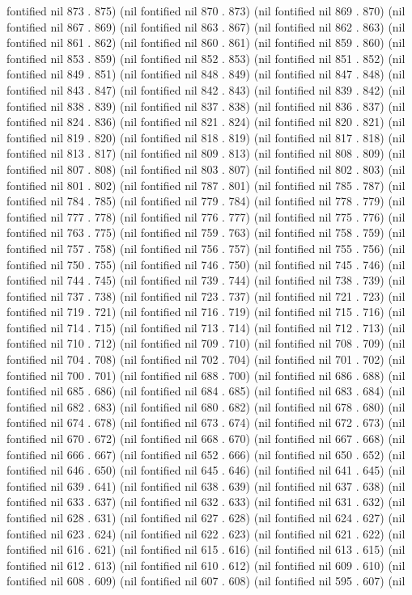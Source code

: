 fontified nil 873 . 875) (nil fontified nil 870 . 873) (nil fontified nil 869 . 870) (nil fontified nil 867 . 869) (nil fontified nil 863 . 867) (nil fontified nil 862 . 863) (nil fontified nil 861 . 862) (nil fontified nil 860 . 861) (nil fontified nil 859 . 860) (nil fontified nil 853 . 859) (nil fontified nil 852 . 853) (nil fontified nil 851 . 852) (nil fontified nil 849 . 851) (nil fontified nil 848 . 849) (nil fontified nil 847 . 848) (nil fontified nil 843 . 847) (nil fontified nil 842 . 843) (nil fontified nil 839 . 842) (nil fontified nil 838 . 839) (nil fontified nil 837 . 838) (nil fontified nil 836 . 837) (nil fontified nil 824 . 836) (nil fontified nil 821 . 824) (nil fontified nil 820 . 821) (nil fontified nil 819 . 820) (nil fontified nil 818 . 819) (nil fontified nil 817 . 818) (nil fontified nil 813 . 817) (nil fontified nil 809 . 813) (nil fontified nil 808 . 809) (nil fontified nil 807 . 808) (nil fontified nil 803 . 807) (nil fontified nil 802 . 803) (nil fontified nil 801 . 802) (nil fontified nil 787 . 801) (nil fontified nil 785 . 787) (nil fontified nil 784 . 785) (nil fontified nil 779 . 784) (nil fontified nil 778 . 779) (nil fontified nil 777 . 778) (nil fontified nil 776 . 777) (nil fontified nil 775 . 776) (nil fontified nil 763 . 775) (nil fontified nil 759 . 763) (nil fontified nil 758 . 759) (nil fontified nil 757 . 758) (nil fontified nil 756 . 757) (nil fontified nil 755 . 756) (nil fontified nil 750 . 755) (nil fontified nil 746 . 750) (nil fontified nil 745 . 746) (nil fontified nil 744 . 745) (nil fontified nil 739 . 744) (nil fontified nil 738 . 739) (nil fontified nil 737 . 738) (nil fontified nil 723 . 737) (nil fontified nil 721 . 723) (nil fontified nil 719 . 721) (nil fontified nil 716 . 719) (nil fontified nil 715 . 716) (nil fontified nil 714 . 715) (nil fontified nil 713 . 714) (nil fontified nil 712 . 713) (nil fontified nil 710 . 712) (nil fontified nil 709 . 710) (nil fontified nil 708 . 709) (nil fontified nil 704 . 708) (nil fontified nil 702 . 704) (nil fontified nil 701 . 702) (nil fontified nil 700 . 701) (nil fontified nil 688 . 700) (nil fontified nil 686 . 688) (nil fontified nil 685 . 686) (nil fontified nil 684 . 685) (nil fontified nil 683 . 684) (nil fontified nil 682 . 683) (nil fontified nil 680 . 682) (nil fontified nil 678 . 680) (nil fontified nil 674 . 678) (nil fontified nil 673 . 674) (nil fontified nil 672 . 673) (nil fontified nil 670 . 672) (nil fontified nil 668 . 670) (nil fontified nil 667 . 668) (nil fontified nil 666 . 667) (nil fontified nil 652 . 666) (nil fontified nil 650 . 652) (nil fontified nil 646 . 650) (nil fontified nil 645 . 646) (nil fontified nil 641 . 645) (nil fontified nil 639 . 641) (nil fontified nil 638 . 639) (nil fontified nil 637 . 638) (nil fontified nil 633 . 637) (nil fontified nil 632 . 633) (nil fontified nil 631 . 632) (nil fontified nil 628 . 631) (nil fontified nil 627 . 628) (nil fontified nil 624 . 627) (nil fontified nil 623 . 624) (nil fontified nil 622 . 623) (nil fontified nil 621 . 622) (nil fontified nil 616 . 621) (nil fontified nil 615 . 616) (nil fontified nil 613 . 615) (nil fontified nil 612 . 613) (nil fontified nil 610 . 612) (nil fontified nil 609 . 610) (nil fontified nil 608 . 609) (nil fontified nil 607 . 608) (nil fontified nil 595 . 607) (nil 